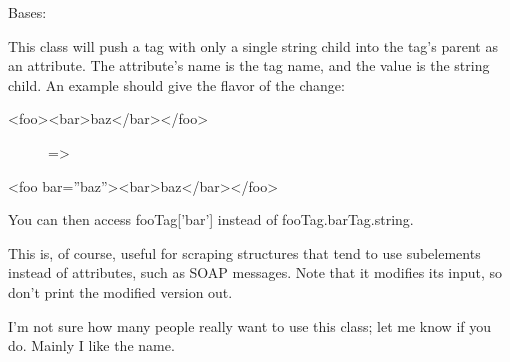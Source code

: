 \documentclass[letterpaper,10pt,english]{sphinxmanual}
\begin{document}

\begin{fulllineitems}
\label{SamPy.parsing:SamPy.parsing.BeautifulSoup.BeautifulSOAP}
Bases: {\hyperref[SamPy.parsing:SamPy.parsing.BeautifulSoup.BeautifulStoneSoup]{}}

This class will push a tag with only a single string child into
the tag's parent as an attribute. The attribute's name is the tag
name, and the value is the string child. An example should give
the flavor of the change:
\begin{description}
\item[{\textless{}foo\textgreater{}\textless{}bar\textgreater{}baz\textless{}/bar\textgreater{}\textless{}/foo\textgreater{}}] \leavevmode
=\textgreater{}

\end{description}

\textless{}foo bar=''baz''\textgreater{}\textless{}bar\textgreater{}baz\textless{}/bar\textgreater{}\textless{}/foo\textgreater{}

You can then access fooTag{[}'bar'{]} instead of fooTag.barTag.string.

This is, of course, useful for scraping structures that tend to
use subelements instead of attributes, such as SOAP messages. Note
that it modifies its input, so don't print the modified version
out.

I'm not sure how many people really want to use this class; let me
know if you do. Mainly I like the name.


\begin{fulllineitems}
\label{SamPy.parsing:SamPy.parsing.BeautifulSoup.BeautifulSOAP.popTag}
\end{fulllineitems}


\end{fulllineitems}
\end{document}

